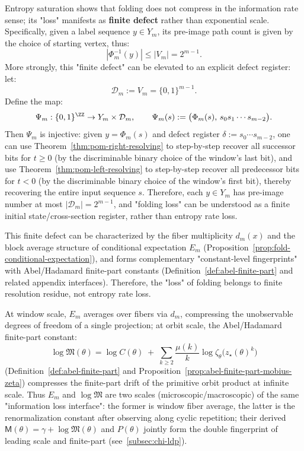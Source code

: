 \begin{remark}\label{rem:pom-finite-defect}
Entropy saturation shows that folding does not compress in the information rate sense; its "loss" manifests as \textbf{finite defect} rather than exponential scale. Specifically, given a label sequence $y\in Y_m$, its pre-image path count is given by the choice of starting vertex, thus:
\[
|\Phi_m^{-1}(y)|\le |V_m|=2^{m-1}.
\]
More strongly, this "finite defect" can be elevated to an explicit defect register: let:
\[
\mathcal{D}_m:=V_m=\{0,1\}^{m-1}.
\]
Define the map:
\[
\Psi_m:\{0,1\}^{\ZZ}\to Y_m\times \mathcal{D}_m,\qquad
\Psi_m(s):=\bigl(\Phi_m(s),\,s_0s_1\cdots s_{m-2}\bigr).
\]
Then $\Psi_m$ is injective: given $y=\Phi_m(s)$ and defect register $\delta:=s_0\cdots s_{m-2}$, one can use Theorem~\ref{thm:pom-right-resolving} to step-by-step recover all successor bits for $t\ge 0$ (by the discriminable binary choice of the window's last bit), and use Theorem~\ref{thm:pom-left-resolving} to step-by-step recover all predecessor bits for $t<0$ (by the discriminable binary choice of the window's first bit), thereby recovering the entire input sequence $s$.
Therefore, each $y\in Y_m$ has pre-image number at most $|\mathcal{D}_m|=2^{m-1}$, and "folding loss" can be understood as a finite initial state/cross-section register, rather than entropy rate loss.

This finite defect can be characterized by the fiber multiplicity $d_m(x)$ and the block average structure of conditional expectation $E_m$ (Proposition~\ref{prop:fold-conditional-expectation}), and forms complementary "constant-level fingerprints" with Abel/Hadamard finite-part constants (Definition~\ref{def:abel-finite-part} and related appendix interfaces). Therefore, the "loss" of folding belongs to finite resolution residue, not entropy rate loss.
\end{remark}

\begin{remark}\label{rem:pom-em-logm}
At window scale, $E_m$ averages over fibers via $d_m$, compressing the unobservable degrees of freedom of a single projection; at orbit scale, the Abel/Hadamard finite-part constant:
\[
\log\mathfrak{M}(\theta)
=
\log C(\theta)
\;+\;
\sum_{k\ge 2}\frac{\mu(k)}{k}\log\zeta_\theta\!\bigl(z_\star(\theta)^k\bigr)
\]
(Definition~\ref{def:abel-finite-part} and Proposition~\ref{prop:abel-finite-part-mobius-zeta}) compresses the finite-part drift of the primitive orbit product at infinite scale. Thus $E_m$ and $\log\mathfrak{M}$ are two scales (microscopic/macroscopic) of the same "information loss interface": the former is window fiber average, the latter is the renormalization constant after observing along cyclic repetition; their derived $\mathsf{M}(\theta)=\gamma+\log\mathfrak{M}(\theta)$ and $P(\theta)$ jointly form the double fingerprint of leading scale and finite-part (see~\ref{subsec:chi-ldp}).
\end{remark}

